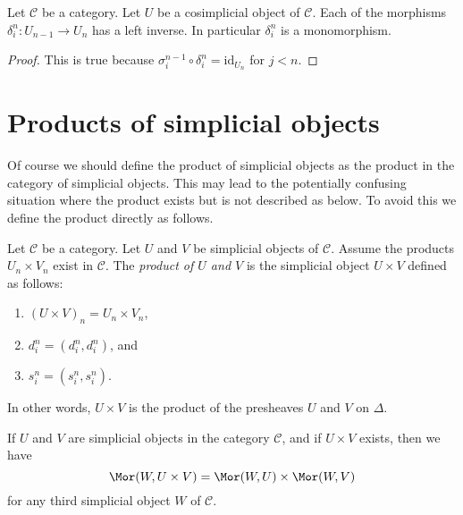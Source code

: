 \begin{lemma}
\label{lemma-di-injective}
Let $\mathcal{C}$ be a category.
Let $U$ be a cosimplicial object of $\mathcal{C}$.
Each of the morphisms $\delta^n_i : U_{n - 1} \to U_n$
has a left inverse. In particular $\delta^n_i$ is a monomorphism.
\end{lemma}

\begin{proof}
This is true because
$\sigma_i^{n - 1} \circ \delta^n_i = \text{id}_{U_n}$
for $j < n$.
\end{proof}


























\section{Products of simplicial objects}
\label{section-products}

\noindent
Of course we should define the product of simplicial objects
as the product in the category of simplicial objects. This
may lead to the potentially confusing situation where the product exists
but is not described as below. To avoid this we define the product
directly as follows.

\begin{definition}
\label{definition-product}
Let $\mathcal{C}$ be a category.
Let $U$ and $V$ be simplicial objects of $\mathcal{C}$.
Assume the products $U_n \times V_n$ exist in $\mathcal{C}$.
The {\it product of $U$ and $V$} is the simplicial object
$U \times V$ defined as follows:
\begin{enumerate}
\item $(U \times V)_n = U_n \times V_n$,
\item $d^n_i = (d^n_i, d^n_i)$, and
\item $s^n_i = (s^n_i, s^n_i)$.
\end{enumerate}
In other words, $U \times V$ is the product of the presheaves
$U$ and $V$ on $\Delta$.
\end{definition}

\begin{lemma}
\label{lemma-product}
If $U$ and $V$ are simplicial objects in the category $\mathcal{C}$,
and if $U \times V$ exists, then we have
$$
\Mor(W, U \times V) =
\Mor(W, U) \times
\Mor(W, V)
$$
for any third simplicial object $W$ of $\mathcal{C}$.
\end{lemma}

